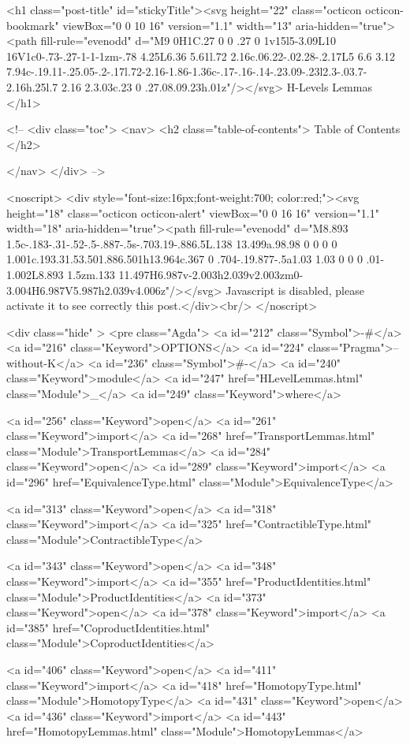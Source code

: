   <h1 class="post-title" id="stickyTitle"><svg height="22" class="octicon octicon-bookmark" viewBox="0 0 10 16" version="1.1" width="13" aria-hidden="true"><path fill-rule="evenodd" d="M9 0H1C.27 0 0 .27 0 1v15l5-3.09L10 16V1c0-.73-.27-1-1-1zm-.78 4.25L6.36 5.61l.72 2.16c.06.22-.02.28-.2.17L5 6.6 3.12 7.94c-.19.11-.25.05-.2-.17l.72-2.16-1.86-1.36c-.17-.16-.14-.23.09-.23l2.3-.03.7-2.16h.25l.7 2.16 2.3.03c.23 0 .27.08.09.23h.01z"/></svg> H-Levels Lemmas
  </h1>

  <!-- 
  <div class="toc">
    <nav>
    <h2 class="table-of-contents"> Table of Contents </h2>
      

    </nav>
  </div>
   -->

  <noscript>
  <div style="font-size:16px;font-weight:700; color:red;"><svg height="18" class="octicon octicon-alert" viewBox="0 0 16 16" version="1.1" width="18" aria-hidden="true"><path fill-rule="evenodd" d="M8.893 1.5c-.183-.31-.52-.5-.887-.5s-.703.19-.886.5L.138 13.499a.98.98 0 0 0 0 1.001c.193.31.53.501.886.501h13.964c.367 0 .704-.19.877-.5a1.03 1.03 0 0 0 .01-1.002L8.893 1.5zm.133 11.497H6.987v-2.003h2.039v2.003zm0-3.004H6.987V5.987h2.039v4.006z"/></svg> Javascript is disabled, please activate it to see correctly this post.</div><br/>
  </noscript>

  <div class="hide" >
<pre class="Agda">
<a id="212" class="Symbol">{-#</a> <a id="216" class="Keyword">OPTIONS</a> <a id="224" class="Pragma">--without-K</a> <a id="236" class="Symbol">#-}</a>
<a id="240" class="Keyword">module</a> <a id="247" href="HLevelLemmas.html" class="Module">_</a> <a id="249" class="Keyword">where</a>

<a id="256" class="Keyword">open</a> <a id="261" class="Keyword">import</a> <a id="268" href="TransportLemmas.html" class="Module">TransportLemmas</a>
<a id="284" class="Keyword">open</a> <a id="289" class="Keyword">import</a> <a id="296" href="EquivalenceType.html" class="Module">EquivalenceType</a>

<a id="313" class="Keyword">open</a> <a id="318" class="Keyword">import</a> <a id="325" href="ContractibleType.html" class="Module">ContractibleType</a>

<a id="343" class="Keyword">open</a> <a id="348" class="Keyword">import</a> <a id="355" href="ProductIdentities.html" class="Module">ProductIdentities</a>
<a id="373" class="Keyword">open</a> <a id="378" class="Keyword">import</a> <a id="385" href="CoproductIdentities.html" class="Module">CoproductIdentities</a>

<a id="406" class="Keyword">open</a> <a id="411" class="Keyword">import</a> <a id="418" href="HomotopyType.html" class="Module">HomotopyType</a>
<a id="431" class="Keyword">open</a> <a id="436" class="Keyword">import</a> <a id="443" href="HomotopyLemmas.html" class="Module">HomotopyLemmas</a>

